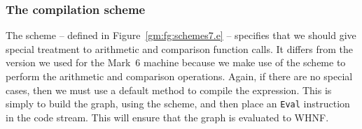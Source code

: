\subsubsection{The \tE{} compilation scheme}

The \tE{} scheme -- defined in Figure~\ref{gm:fg:schemes7.e} --
specifies that we should give special treatment to arithmetic and
comparison function calls. It differs from the version we used for the
Mark~6 machine because we make use of the \tB{} scheme to perform the
arithmetic and comparison operations. Again, if there are no special
cases, then we must use a default method to compile the expression.
This is simply to build the graph, using the \tC{} scheme, and then
place an \mbox{\tt Eval} instruction in the code stream. This will ensure that
the graph is evaluated to WHNF.
